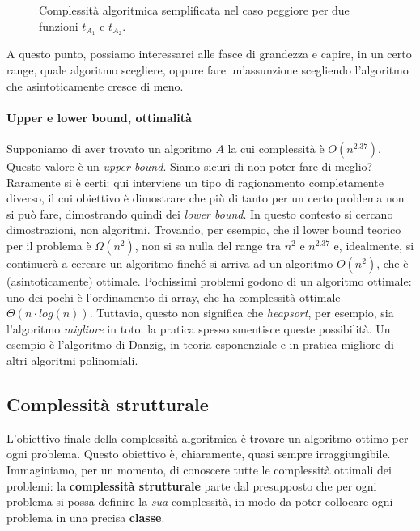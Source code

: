 \begin{figure}[ht]
	\centering
	\caption{Complessità algoritmica semplificata nel caso peggiore per due funzioni $t_{A_1}$ e $t_{A_2}$.}
	\label{fig:t1t2algcomp}
\end{figure}

A questo punto, possiamo interessarci alle fasce di grandezza e capire, in un
certo range, quale algoritmo scegliere, oppure fare un'assunzione scegliendo
l'algoritmo che asintoticamente cresce di meno.

\paragraph{Upper e lower bound, ottimalità}
Supponiamo di aver trovato un algoritmo $A$ la cui complessità è $O(n^{2.37})$.
Questo valore è un \textit{upper bound}. Siamo sicuri di non poter fare di meglio?
Raramente si è certi: qui interviene un tipo di ragionamento completamente
diverso, il cui obiettivo è dimostrare che più di tanto per un certo problema
non si può fare, dimostrando quindi dei \textit{lower bound}. In questo contesto
si cercano dimostrazioni, non algoritmi. Trovando, per esempio, che il lower
bound teorico per il problema è $\Omega(n^2)$, non si sa nulla del range tra
$n^2$ e $n^{2.37}$ e, idealmente, si continuerà a cercare un algoritmo finché si arriva ad un
algoritmo $O(n^2)$, che è (asintoticamente) ottimale. Pochissimi problemi
godono di un algoritmo ottimale: uno dei pochi è l'ordinamento di array, che ha
complessità ottimale $\Theta(n\cdot log(n))$. Tuttavia, questo non significa
che \textit{heapsort}, per esempio, sia l'algoritmo \textit{migliore} in toto:
la pratica spesso smentisce queste possibilità. Un esempio è l'algoritmo
di Danzig, in teoria esponenziale e in pratica migliore di altri algoritmi
polinomiali.

\subsection{Complessità strutturale}
L'obiettivo finale della complessità algoritmica è trovare un algoritmo ottimo
per ogni problema. Questo obiettivo è, chiaramente, quasi sempre
irraggiungibile. Immaginiamo, per un momento, di conoscere tutte le complessità
ottimali dei problemi: la {\bf complessità strutturale} parte dal presupposto
che per ogni problema si possa definire la \textit{sua} complessità, in modo da
poter collocare ogni problema in una precisa \textbf{classe}.

